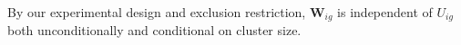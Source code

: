 \begin{appendix}
By our experimental design and exclusion restriction, $\mathbf{W}_{ig}$ is independent of $U_{ig}$ both unconditionally and conditional on cluster size. 

\end{appendix}
